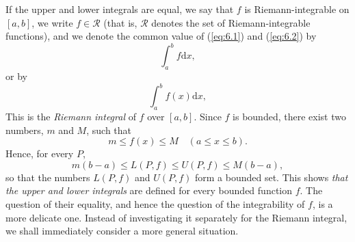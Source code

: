 {    If the upper and lower integrals are equal, 
    we say that $f$ is Riemann-integrable on $[a, b]$, 
    we write $f \in \mathscr{R}$ 
    (that is, $\mathscr{R}$ denotes the set of Riemann-integrable functions), 
    and we denote the common value of (\ref{eq:6.1}) and (\ref{eq:6.2}) by
    \begin{equation}
        \label{eq:6.3}
        \int_{a}^{b} f \text{d}x,
    \end{equation}
    or by 
    \begin{equation}
        \label{eq:6.4}
        \int_{a}^{b} f(x) \text{d}x,
    \end{equation}
    This is the \emph{Riemann integral} of $f$ over $[a, b]$. 
    Since $f$ is bounded, there exist two numbers, $m$ and $M$, such that
    \begin{equation*}
        m \leq f(x) \leq M \quad 
        (a \leq x \leq b).
    \end{equation*}
    Hence, for every $P$,
    \begin{equation*}
        m(b - a) \leq L(P,f) \leq U(P,f) \leq M(b - a),
    \end{equation*}
    so that the numbers $L(P,f)$ and $U(P,f)$ form a bounded set. 
    This shows \emph{that the upper and lower integrals} are defined for every bounded function $f$.
    The question of their equality, 
    and hence the question of the integrability of $f$, is a more delicate one. 
    Instead of investigating it separately for the Riemann integral,
    we shall immediately consider a more general situation.
}

